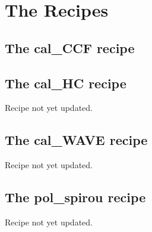 \chapter{The Recipes}
\label{ch:the_recipes}


















\clearpage
\newpage
\section{The cal\_CCF recipe}
\label{ch:the_recipes:cal_CCF_E2DS_spirou}





\clearpage
\newpage
\section{The cal\_HC recipe}
\label{ch:the_recipes:cal_HC_E2DS_spirou}

Recipe not yet updated.


\section{The cal\_WAVE recipe}
\label{ch:the_recipes:cal_WAVE_E2DS_spirou}

Recipe not yet updated.


\section{The pol\_spirou recipe}
\label{ch:the_recipes:pol_spirou}

Recipe not yet updated.
